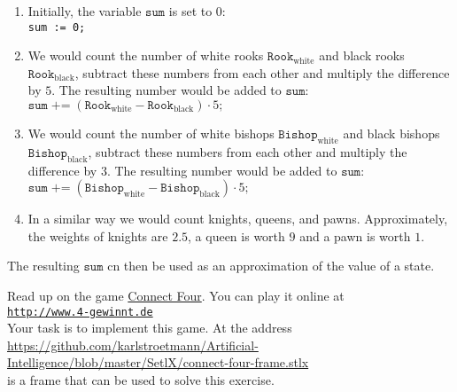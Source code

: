 \begin{enumerate}
\item Initially, the variable $\mathtt{sum}$ is set to $0$:
      \\[0.2cm]
      \hspace*{1.3cm}
      \texttt{sum := 0;}
\item We would count the number of white rooks $\mathtt{Rook}_{\mathrm{white}}$ and black rooks $\mathtt{Rook}_{\mathrm{black}}$,
      subtract these numbers from each other and multiply the difference by $5$.  
      The resulting number would be added to $\mathtt{sum}$:
      \\[0.2cm]
      \hspace*{1.3cm}
      $\mathtt{sum} \;\texttt{+=}\; (\mathtt{Rook}_{\mathrm{white}} - \mathtt{Rook}_{\mathrm{black}}) \cdot 5\mathtt{;}$
\item We would count the number of white bishops $\mathtt{Bishop}_{\mathrm{white}}$ and black bishops
      $\mathtt{Bishop}_{\mathrm{black}}$,
      subtract these numbers from each other and multiply the difference by $3$.  
      The resulting number would be added to $\mathtt{sum}$:
      \\[0.2cm]
      \hspace*{1.3cm}
      $\mathtt{sum} \;\texttt{+=}\; (\mathtt{Bishop}_{\mathrm{white}} - \mathtt{Bishop}_{\mathrm{black}}) \cdot 5\mathtt{;}$
\item In a similar way we would count knights, queens, and pawns.  Approximately, the weights of
      knights are $2.5$, a queen is worth $9$ and a pawn is worth $1$.
\end{enumerate}
The resulting $\mathtt{sum}$ cn then be used as an approximation of the value of a state.


\exercise
Read up on the game \href{https://en.wikipedia.org/wiki/Connect_Four}{Connect Four}.  You can play it online at
\\[0.2cm]
\hspace*{1.3cm}
\href{http://www.4-gewinnt.de}{\texttt{http://www.4-gewinnt.de}}
\\[0.2cm]
Your task is to implement this game.  At the address
\\[0.2cm]
\hspace*{1.3cm}
\href{https://github.com/karlstroetmann/Artificial-Intelligence/blob/master/SetlX/connect-four-frame.stlx}{https://github.com/karlstroetmann/Artificial-Intelligence/blob/master/SetlX/connect-four-frame.stlx}
\\[0.2cm]
is a frame that can be used to solve this exercise.
\eox


